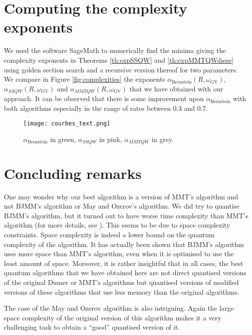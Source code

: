 \section{Computing the complexity exponents	}
We used the software SageMath to numerically find the minima giving the complexity exponents in Theorems
\ref{th:expSSQW} and \ref{th:expMMTQWdiese} using golden section search and a recursive version thereof for two parameters.
We compare in Figure \ref{fig:complexities} the exponents $\alpha_{\text{Bernstein}}(R,\omega_{\text{GV}})$, $\alpha_{SSQW}(R,\omega_{\text{GV}})$ 
and $\alpha_{MMTQW}(R,\omega_{\text{GV}})$ that we have obtained with our approach. It can be observed that there is some improvement upon 
$\alpha_{\text{Bernstein}}$ with both algorithms especially in the range of rates between 0.3 and 0.7.
\begin{figure}[h!]
    \centering
    \texttt{[image: courbes\_text.png]}
    \caption{$\alpha_{\text{Bernstein}}$ in green, $\alpha_{SSQW}$ in pink, $\alpha_{MMTQW}$ in grey. \label{fig:complexities}}
    \label{fig:courbes}
\end{figure}
\section{Concluding remarks}
One may wonder why our best algorithm is a version of MMT's algorithm  and not BJMM's algorithm or May and Ozerov's algorithm. We did try to quantise BJMM's algorithm, but it turned out to have worse time complexity than MMT's algorithm (for more details, see \cite{K16}). 
This seems to be due to space complexity constraints. Space complexity is indeed a lower bound on the quantum complexity of the algorithm. It has actually   been shown \cite[Chap. 10, Sec. 3]{B12} that BJMM's algorithm uses more space than MMT's algorithm, even when it is optimised to use the least amount of space. Moreover, it is rather insightful that in all cases, the best quantum algorithms that we have obtained here are not direct quantised versions of the original Dumer or MMT's algorithms but quantised versions of modified versions of these algorithms that use less memory than the original
algorithms.

The case of the May and Ozerov algorithm is also intriguing. Again the large space complexity of the original version of this algorithm makes it a very challenging task to obtain a ``good'' quantised version of it.

